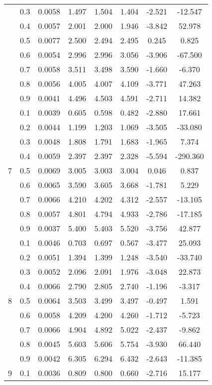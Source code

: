 \documentclass[11pt,a4paper]{report}
\begin{document}
\begin{longtable}{ | c | c || c | c | c | c | c | c | }
 & 0.3 & 0.0058 & 1.497 & 1.504 & 1.404 & -2.521 & -12.547 \\
 & 0.4 & 0.0057 & 2.001 & 2.000 & 1.946 & -3.842 & 52.978 \\
 & 0.5 & 0.0077 & 2.500 & 2.494 & 2.495 & 0.245 & 0.825 \\
 & 0.6 & 0.0054 & 2.996 & 2.996 & 3.056 & -3.906 & -67.500 \\
 & 0.7 & 0.0058 & 3.511 & 3.498 & 3.590 & -1.660 & -6.370 \\
 & 0.8 & 0.0056 & 4.005 & 4.007 & 4.109 & -3.771 & 47.263 \\
 & 0.9 & 0.0041 & 4.496 & 4.503 & 4.591 & -2.711 & 14.382 \\
 \hline
\multirow{9}{*}{7} & 0.1 & 0.0039 & 0.605 & 0.598 & 0.482 & -2.880 & 17.661 \\
 & 0.2 & 0.0044 & 1.199 & 1.203 & 1.069 & -3.505 & -33.080 \\
 & 0.3 & 0.0048 & 1.808 & 1.791 & 1.683 & -1.965 & 7.374 \\
 & 0.4 & 0.0059 & 2.397 & 2.397 & 2.328 & -5.594 & -290.360 \\
 & 0.5 & 0.0069 & 3.005 & 3.003 & 3.004 & 0.046 & 0.837 \\
 & 0.6 & 0.0065 & 3.590 & 3.605 & 3.668 & -1.781 & 5.229 \\
 & 0.7 & 0.0066 & 4.210 & 4.202 & 4.312 & -2.557 & -13.105 \\
 & 0.8 & 0.0057 & 4.801 & 4.794 & 4.933 & -2.786 & -17.185 \\
 & 0.9 & 0.0037 & 5.400 & 5.403 & 5.520 & -3.756 & 42.877 \\
 \hline
\multirow{9}{*}{8} & 0.1 & 0.0046 & 0.703 & 0.697 & 0.567 & -3.477 & 25.093 \\
 & 0.2 & 0.0051 & 1.394 & 1.399 & 1.248 & -3.540 & -33.740 \\
 & 0.3 & 0.0052 & 2.096 & 2.091 & 1.976 & -3.048 & 22.873 \\
 & 0.4 & 0.0066 & 2.790 & 2.805 & 2.740 & -1.196 & -3.317 \\
 & 0.5 & 0.0064 & 3.503 & 3.499 & 3.497 & -0.497 & 1.591 \\
 & 0.6 & 0.0058 & 4.209 & 4.200 & 4.260 & -1.712 & -5.723 \\
 & 0.7 & 0.0066 & 4.904 & 4.892 & 5.022 & -2.437 & -9.862 \\
 & 0.8 & 0.0045 & 5.603 & 5.606 & 5.754 & -3.930 & 66.440 \\
 & 0.9 & 0.0042 & 6.305 & 6.294 & 6.432 & -2.643 & -11.385 \\
 \hline
\multirow{9}{*}{9} & 0.1 & 0.0036 & 0.809 & 0.800 & 0.660 & -2.716 & 15.177 \\

\end{longtable}
\end{document}
